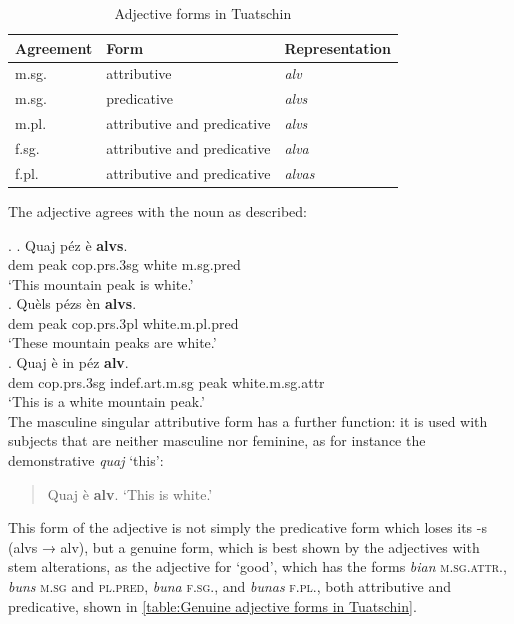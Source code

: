 \documentclass[a4paper, 11pt]{book}
\begin{document}
\begin{table}[ht!]
	\centering
	\begin{tabular}{lll}
        \toprule
        \textbf{Agreement} & \textbf{Form} & \textbf{Representation} \\

        \midrule

        m.sg. & attributive &	\textit{alv} \\
        m.sg. & predicative & \textit{alvs} \\
        m.pl. & attributive and predicative & 	\textit{alvs} \\
        f.sg. & attributive and predicative & 	\textit{alva} \\
        f.pl. & attributive and predicative & 	\textit{alvas} \\

        \bottomrule

        
\end{tabular}
	\caption{Adjective forms in Tuatschin}
	\label{tab:Adjective forms in Tuatschin}
\end{table}



The adjective agrees with the noun as described:

\ex.
\ag. Quaj péz è \textbf{alvs}.	\\
dem peak cop.prs.3sg white m.sg.pred \\
‘This mountain peak is white.’\\
\bg. Quèls pézs èn \textbf{alvs}. \\
dem peak cop.prs.3pl white.m.pl.pred \\
‘These mountain peaks are white.’ \\
\cg. Quaj è in péz \textbf{alv}. \\
dem cop.prs.3sg indef.art.m.sg peak white.m.sg.attr \\
‘This is a white mountain peak.’ \\


The masculine singular attributive form has a further function: it is used with subjects that are neither masculine nor feminine, as for instance the demonstrative \textit{quaj} ‘this’:

\begin{quote}
  Quaj è \textbf{alv}.	‘This is white.’
\end{quote}

This form of the adjective is not simply the predicative form which loses its -s (alvs → alv), but a genuine form, which is best shown by the adjectives with stem alterations, as the adjective for ‘good’, which has the forms \textit{bian} \textsc{m.sg.attr.}, \textit{buns} \textsc{m.sg} and \textsc{pl.pred}, \textit{buna} \textsc{f.sg.}, and \textit{bunas} \textsc{f.pl.}, both attributive and predicative, shown in \ref{table:Genuine adjective forms in Tuatschin}.
\end{document}

